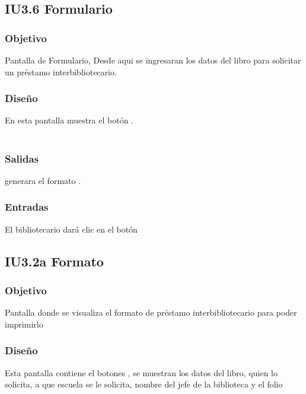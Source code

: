 \newpage
\subsection{IU3.6 Formulario}

\subsubsection{Objetivo}
	Pantalla de Formulario, Desde aqui se ingresaran los datos del libro para solicitar un préstamo interbibliotecario.  

\subsubsection{Diseño}
	En esta pantalla muestra el botón  .  \\\\


\subsubsection{Salidas}
	\begin{Citemize}
		\item generara el formato . 
	\end{Citemize}
	
\subsubsection{Entradas}
	\begin{Citemize}
		\item El bibliotecario dará clic en el botón \IUbutton{Guardar}
	\end{Citemize}




\subsection{IU3.2a Formato}

\subsubsection{Objetivo}
	Pantalla donde se visualiza el formato de préstamo interbibliotecario para poder imprimirlo 

\subsubsection{Diseño}
	Esta pantalla contiene el botones , se muestran los datos del libro, quien lo solicita, a que escuela se le solicita, nombre del jefe de la biblioteca y el folio  \\\\

